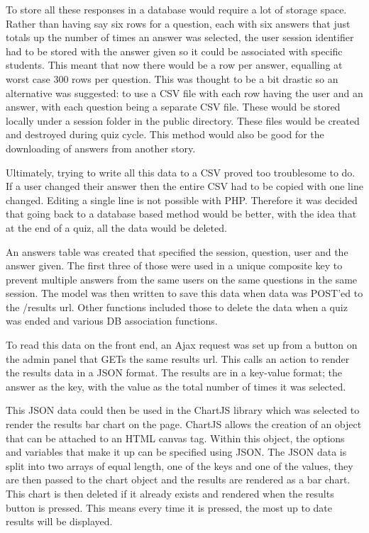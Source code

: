 To store all these responses in a database would require a lot of storage space. Rather than having say six rows for a question, each with six answers that just totals up the number of times an answer was selected, the user session identifier had to be stored with the answer given so it could be associated with specific students. This meant that now there would be a row per answer, equalling at worst case 300 rows per question. This was thought to be a bit drastic so an alternative was suggested: to use a CSV file with each row having the user and an answer, with each question being a separate CSV file. These would be stored locally under a session folder in the public directory. These files would be created and destroyed during quiz cycle. This method would also be good for the downloading of answers from another story. 

Ultimately, trying to write all this data to a CSV proved too troublesome to do. If a user changed their answer then the entire CSV had to be copied with one line changed. Editing a single line is not possible with PHP. Therefore it was decided that going back to a database based method would be better, with the idea that at the end of a quiz, all the data would be deleted.

An answers table was created that specified the session, question, user and the answer given. The first three of those were used in a unique composite key to prevent multiple answers from the same users on the same questions in the same session. The model was then written to save this data when data was POST'ed to the /results url. Other functions included those to delete the data when a quiz was ended and various DB association functions.

To read this data on the front end, an Ajax request was set up from a button on the admin panel that GETs the same results url. This calls an action to render the results data in a JSON format. The results are in a key-value format; the answer as the key, with the value as the total number of times it was selected.

This JSON data could then be used in the ChartJS library which was selected to render the results bar chart on the page\cite{chartjs}. ChartJS allows the creation of an object that can be attached to an HTML canvas tag. Within this object, the options and variables that make it up can be specified using JSON. The JSON data is split into two arrays of equal length, one of the keys and one of the values, they are then passed to the chart object and the results are rendered as a bar chart. This chart is then deleted if it already exists and rendered when the results button is pressed. This means every time it is pressed, the most up to date results will be displayed. 
